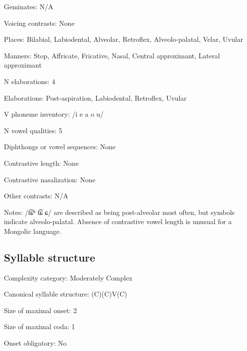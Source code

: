 {\begin{appendixdesc}
\item[Geminates:] N/A

\item[Voicing contrasts:] None

\item[Places:] Bilabial, Labiodental, Alveolar, Retroflex, Alveolo-palatal, Velar, Uvular

\item[Manners:] Stop, Affricate, Fricative, Nasal, Central approximant, Lateral approximant

\item[N elaborations:] 4

\item[Elaborations:] Post-aspiration, Labiodental, Retroflex, Uvular

\item[V phoneme inventory:] /i e a o u/

\item[N vowel qualities:] 5

\item[Diphthongs or vowel sequences:] None

\item[Contrastive length:] None

\item[Contrastive nasalization:] None

\item[Other contrasts:] N/A

\item[Notes:] /t͡ɕʰ t͡ɕ ɕ/ are described as being post-alveolar most often, but symbols indicate alveolo-palatal. Absence of contrastive vowel length is unusual for a Mongolic language.
\end{appendixdesc}
\subsection*{Syllable structure}
\begin{appendixdesc}

\item[Complexity category:] Moderately Complex

\item[Canonical syllable structure:] (C)(C)V(C) \citep[54--72]{Slater2003}

\item[Size of maximal onset:] 2

\item[Size of maximal coda:] 1

\item[Onset obligatory:] No


\end{appendixdesc}}
